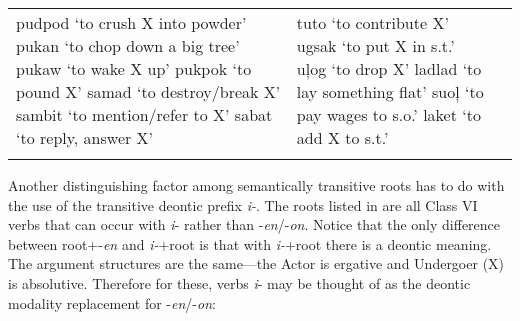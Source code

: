 \begin{table}
{\begin{tabular}{
        >{\RaggedRight\arraybackslash}p{4.3cm}
        >{\RaggedRight\arraybackslash}p{4cm}
        >{\RaggedRight\arraybackslash}p{4.2cm}
       }
pudpod ‘to crush X into powder’\newline 
pukan ‘to chop down a big tree’\newline 
pukaw ‘to wake X up’\newline 
pukpok ‘to pound X’\newline 
samad ‘to destroy/break X’\newline 
sambit ‘to mention/refer to X’\newline 
sabat ‘to reply, answer X’
&
tuto ‘to contribute X’\newline 
ugsak ‘to put X in s.t.’\newline 
uļog ‘to drop X’\newline 
ladlad ‘to lay something flat’\newline 
suoļ ‘to pay wages to s.o.’\newline 
laket ‘to add X to s.t.’ 

& \\
\lspbottomrule
\end{tabular}
} %
\end{table}

Another distinguishing factor among semantically transitive roots has to do with the use of the transitive deontic prefix \textit{i-}. The roots listed in  are all Class VI verbs that can occur with \textit{i}{}- rather than -\textit{en}/-\textit{on}. Notice that the only difference between root+-\textit{en} and \textit{i-}+root is that with \textit{i-}+root there is a deontic meaning. The argument structures are the same—the Actor is ergative and Undergoer (X) is absolutive. Therefore for these, verbs \textit{i}{}- may be thought of as the deontic modality replacement for -\textit{en}/-\textit{on}:

